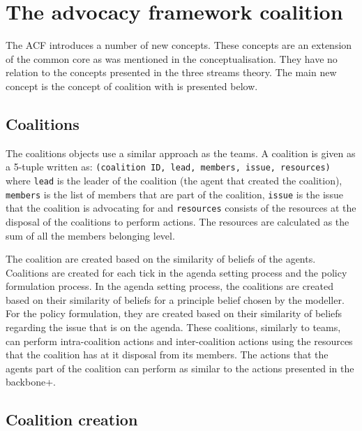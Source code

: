 \section{The advocacy framework coalition}

The ACF introduces a number of new concepts. These concepts are an extension of the common core as was mentioned in the conceptualisation. They have no relation to the concepts presented in the three streams theory. The main new concept is the concept of coalition with is presented below.

\subsection{Coalitions}

The coalitions objects use a similar approach as the teams. A coalition is given as a 5-tuple written as: \texttt{(coalition ID, lead, members, issue, resources)} where \texttt{lead} is the leader of the coalition (the agent that created the coalition), \texttt{members} is the list of members that are part of the coalition, \texttt{issue} is the issue that the coalition is advocating for and \texttt{resources} consists of the resources at the disposal of the coalitions to perform actions. The resources are calculated as the sum of all the members belonging level.

The coalition are created based on the similarity of beliefs of the agents. Coalitions are created for each tick in the agenda setting process and the policy formulation process. In the agenda setting process, the coalitions are created based on their similarity of beliefs for a principle belief chosen by the modeller. For the policy formulation, they are created based on their similarity of beliefs regarding the issue that is on the agenda. These coalitions, similarly to teams, can perform intra-coalition actions and inter-coalition actions using the resources that the coalition has at it disposal from its members. The actions that the agents part of the coalition can perform as similar to the actions presented in the backbone+.

\subsection{Coalition creation}

